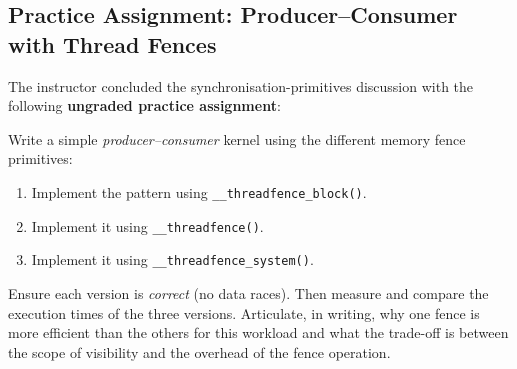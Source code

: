 \subsection{Practice Assignment: Producer--Consumer with Thread Fences}
\label{subsec:assignment}

The instructor concluded the synchronisation-primitives discussion with the
following \textbf{ungraded practice assignment}:

\begin{tcolorbox}[colback=blue!5,
  title=\textbf{Practice Assignment (Ungraded)},fonttitle=\small\bfseries]
  Write a simple \emph{producer--consumer} kernel using the different memory
  fence primitives:
  \begin{enumerate}[noitemsep]
    \item Implement the pattern using \texttt{\_\_threadfence\_block()}.
    \item Implement it using \texttt{\_\_threadfence()}.
    \item Implement it using \texttt{\_\_threadfence\_system()}.
  \end{enumerate}
  Ensure each version is \emph{correct} (no data races). Then measure and
  compare the execution times of the three versions. Articulate, in writing,
  why one fence is more efficient than the others for this workload and what
  the trade-off is between the scope of visibility and the overhead of the
  fence operation.
\end{tcolorbox}

